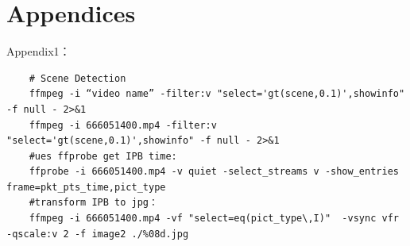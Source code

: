\documentclass[12pt]{article}
\begin{document}
\section*{Appendices}
	\noindent Appendix1：
	\begin{lstlisting}
	# Scene Detection
	ffmpeg -i “video name” -filter:v "select='gt(scene,0.1)',showinfo" -f null - 2>&1
	ffmpeg -i 666051400.mp4 -filter:v "select='gt(scene,0.1)',showinfo" -f null - 2>&1
	#ues ffprobe get IPB time:
	ffprobe -i 666051400.mp4 -v quiet -select_streams v -show_entries frame=pkt_pts_time,pict_type
	#transform IPB to jpg：
	ffmpeg -i 666051400.mp4 -vf "select=eq(pict_type\,I)"  -vsync vfr -qscale:v 2 -f image2 ./%08d.jpg
	\end{lstlisting}
	
	

\end{document}
